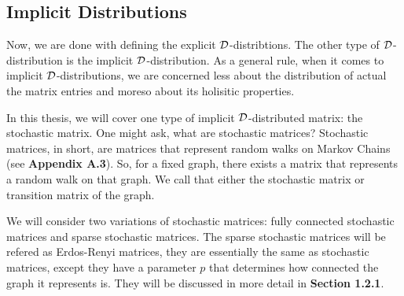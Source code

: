 

\subsection{Implicit Distributions}

Now, we are done with defining the explicit $\mathcal{D}$-distribtions. The other type of $\mathcal{D}$-distribution is the implicit $\mathcal{D}$-distribution.
As a general rule, when it comes to implicit $\mathcal{D}$-distributions, we are concerned less about the distribution of actual the matrix entries and moreso about its holisitic properties.

In this thesis, we will cover one type of implicit $\mathcal{D}$-distributed matrix: the stochastic matrix. One might ask, what are stochastic matrices?
Stochastic matrices, in short, are matrices that represent random walks on Markov Chains (see \textbf{Appendix A.3}). So, for a fixed graph, there exists a matrix that represents a random walk on that graph.
We call that either the stochastic matrix or transition matrix of the graph.

We will consider two variations of stochastic matrices: fully connected stochastic matrices and sparse stochastic matrices.
The sparse stochastic matrices will be refered as Erdos-Renyi matrices, they are essentially the same as stochastic matrices, except they have a parameter $p$ that
determines how connected the graph it represents is. They will be discussed in more detail in \textbf{Section 1.2.1}.

%
%

